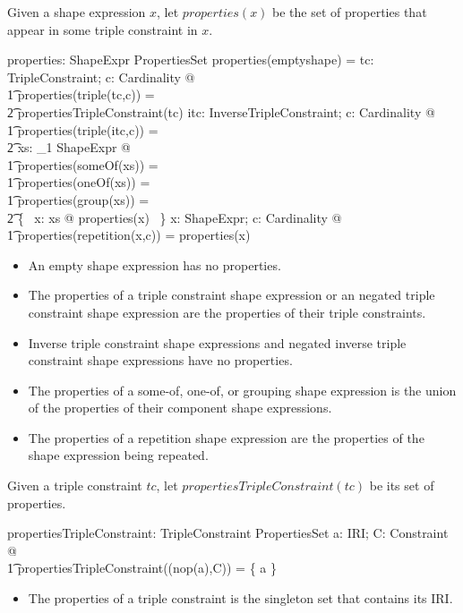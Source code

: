 \documentclass{article}
\begin{document}
Given a shape expression $x$, let $properties(x)$ be the set of properties that appear in some 
triple constraint in $x$.
\begin{axdef}
	properties: ShapeExpr \fun PropertiesSet
\where
	properties(emptyshape) = \emptyset
\also
	\forall tc: TripleConstraint; c: Cardinality @ \\
\t1		properties(triple(tc,c)) = \\
\t2			propertiesTripleConstraint(tc)
\also
	\forall itc: InverseTripleConstraint; c: Cardinality @ \\
\t1		properties(triple(itc,c)) = \\
\t2			\emptyset
\also
	\forall xs: \seq_1 ShapeExpr @ \\
\t1		properties(someOf(xs)) = \\
\t1		properties(oneOf(xs)) = \\
\t1		properties(group(xs)) = \\
\t2			\bigcup \{~ x: \ran xs @ properties(x) ~\}
\also
	\forall x: ShapeExpr; c: Cardinality @ \\
\t1		properties(repetition(x,c)) = properties(x)
\end{axdef}
\begin{itemize}
\item An empty shape expression has no properties.
\item The properties of a triple constraint shape expression or an negated triple constraint
shape expression are the properties of their triple constraints.
\item Inverse triple constraint shape expressions and negated inverse triple constraint shape expressions
have no properties.
\item The properties of a some-of, one-of, or grouping shape expression is the union of the properties of their
component shape expressions.
\item The properties of a repetition shape expression are the properties of the shape expression being repeated.
\end{itemize}

Given a triple constraint $tc$, let $propertiesTripleConstraint(tc)$ be its set of properties.
\begin{axdef}
	propertiesTripleConstraint: TripleConstraint \fun PropertiesSet
\where
	\forall a: IRI; C: Constraint @ \\
\t1		propertiesTripleConstraint((nop(a),C)) = \{ a \}
\end{axdef}
\begin{itemize}
\item The properties of a triple constraint is the singleton set that contains its IRI.
\end{itemize}
\end{document}
